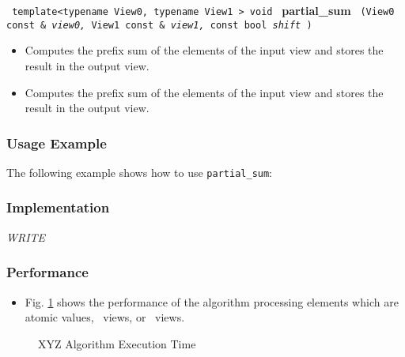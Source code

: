 \noindent
\texttt{%
template<typename View0, typename View1 >
\newline
void 
}
\newline
\textbf{partial\_sum}%
\texttt{%
(View0 const \&
\textit{view0,}%
View1 const \&
\textit{view1,}%
const bool 
\textit{shift}%
)
}

\begin{itemize}
\item
Computes the prefix sum of the elements of the input view and stores the result in the output view. 
\item
Computes the prefix sum of the elements of the input view and stores the result in the output view. 
\end{itemize}

\subsubsection{Usage Example} %

The following example shows how to use \texttt{partial\_sum}:


\subsubsection{Implementation} %

\textit{WRITE}

\subsubsection{Performance} %

\begin{itemize}
\item
Fig. \ref{fig:part-sum-alg-exec-exper}
shows the performance of the algorithm processing
elements which are atomic values, \stl\ views, or \stapl\ views.
\end{itemize}

\begin{figure}[p]
\caption{XYZ Algorithm Execution Time}
\label{fig:part-sum-alg-exec-exper}
\end{figure}

